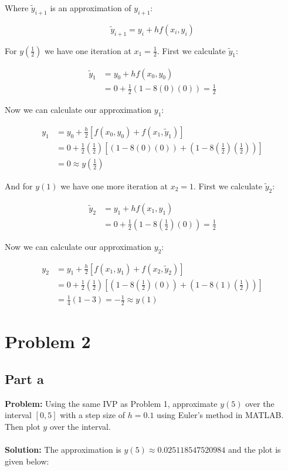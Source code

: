 \documentclass{article}
\begin{document}
Where $\tilde y_{i+1}$ is an approximation of $y_{i+1}$:

$$\tilde y_{i+1}=y_i+hf(x_i,y_i)$$

For $y\left(\frac{1}{2}\right)$ we have one iteration at $x_1=\frac{1}{2}$. First we calculate $\tilde y_1$:

\begin{align*}
  \tilde y_1&=y_0+hf(x_0,y_0)\\
  &=0+\frac{1}{2}(1-8(0)(0))=\frac{1}{2}
\end{align*}

Now we can calculate our approximation $y_1$:

\begin{align*}
  y_1&=y_0+\frac{h}{2}[f(x_0,y_0)+f(x_1,\tilde y_1)]\\
  &=0+\frac{1}{2}\left(\frac{1}{2}\right)\left[(1-8(0)(0))+\left(1-8\left(\frac{1}{2}\right)\left(\frac{1}{2}\right)\right)\right]\\
  &=\boxed{0\approx y\left(\frac{1}{2}\right)}
\end{align*}

And for $y(1)$ we have one more iteration at $x_2=1$. First we calculate $\tilde y_2$:

\begin{align*}
  \tilde y_2&=y_1+hf(x_1,y_1)\\
  &=0+\frac{1}{2}\left(1-8\left(\frac{1}{2}\right)(0)\right)=\frac{1}{2}
\end{align*}

Now we can calculate our approximation $y_2$:

\begin{align*}
  y_2&=y_1+\frac{h}{2}[f(x_1,y_1)+f(x_2,\tilde y_2)]\\
  &=0+\frac{1}{2}\left(\frac{1}{2}\right)\left[\left(1-8\left(\frac{1}{2}\right)(0)\right)+\left(1-8(1)\left(\frac{1}{2}\right)\right)\right]\\
  &=\frac{1}{4}(1-3)=\boxed{-\frac{1}{2}\approx y(1)}
\end{align*}

\section*{Problem 2}
\subsection*{Part a}
\textbf{Problem:} Using the same IVP as Problem 1, approximate $y(5)$ over the interval $[0,5]$ with a step size of $h=0.1$ using Euler's method in MATLAB. Then plot $y$ over the interval.
\\\\
\textbf{Solution:} The approximation is $y(5)\approx 0.025118547520984$ and the plot is given below:
\end{document}
